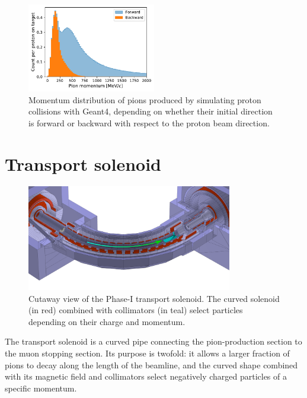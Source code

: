 \begin{figure}
    \centering
    \includegraphics[width=0.5\textwidth]{chapter2/pion_mom-v2.pdf}
    \caption{ Momentum distribution of pions produced by simulating proton
    collisions with Geant4, depending on whether their initial direction is
    forward or backward with respect to the proton beam direction. }
    \label{fig:pion_momentum}
\end{figure}

\section{Transport solenoid}\label{sec:curved_solenoids}

\begin{figure}
    \centering
    \includegraphics[width=0.8\textwidth]{chapter2/transport_solenoid.pdf}
    \caption{ Cutaway view of the Phase-I transport solenoid. The curved
        solenoid (in red) combined with collimators (in teal) select particles
        depending on their charge and momentum. }
    \label{fig:transport_solenoid}
\end{figure}

The transport solenoid is a curved pipe connecting the pion-production section
to the muon stopping section. Its purpose is twofold: it allows a larger
fraction of pions to decay along the length of the beamline, and the curved
shape combined with its magnetic field and collimators select negatively charged
particles of a specific momentum. 


